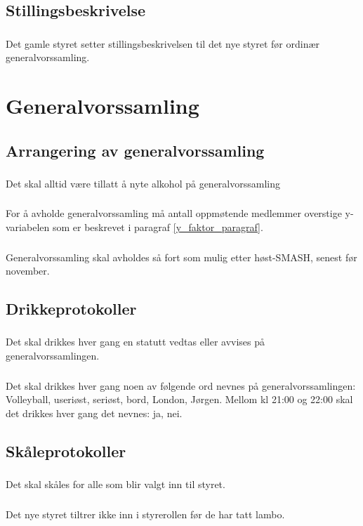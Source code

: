 \documentclass{article}
\newenvironment{statute}[1][]
    {
        \titleformat{\subsubsection}[runin]{\normalfont}{\hspace{1pt}\textit{\S\hspace{5pt}\thesubsubsection}}{0pt}{\rule{4pt}{0pt}}{}
        \subsubsection{}#1
        \begin{minipage}[t]{0.9\linewidth}
    }
    {
        \end{minipage}
        
        \ignorespacesafterend
    }
\begin{document}
        \subsection{Stillingsbeskrivelse}
            \begin{statute}
                Det gamle styret setter stillingsbeskrivelsen til det nye styret før ordinær generalvorssamling.
            \end{statute}
            
    \section{Generalvorssamling}
        \subsection{Arrangering av generalvorssamling}
            \begin{statute}
                Det skal alltid være tillatt å nyte alkohol på generalvorssamling
            \end{statute}
            \begin{statute} 
                For å avholde generalvorssamling må antall oppmøtende medlemmer overstige y-variabelen som er beskrevet i paragraf \ref{y_faktor_paragraf}.
            \end{statute}
            \begin{statute}
                Generalvorssamling skal avholdes så fort som mulig etter høst-SMASH, senest før november.
            \end{statute}
            
        \subsection{Drikkeprotokoller}
            \begin{statute}
                Det skal drikkes hver gang en statutt vedtas eller avvises på generalvorssamlingen.
            \end{statute}
            \begin{statute}
                Det skal drikkes hver gang noen av følgende ord nevnes på generalvorssamlingen: Volleyball, useriøst, seriøst, bord, London, Jørgen. Mellom kl 21:00 og 22:00 skal det drikkes hver gang det nevnes: ja, nei.
            \end{statute}
            
        \subsection{Skåleprotokoller}
            \begin{statute}
                Det skal skåles for alle som blir valgt inn til styret.
            \end{statute}
            \begin{statute}
                Det nye styret tiltrer ikke inn i styrerollen før de har tatt lambo.
            \end{statute}            
\end{document}
